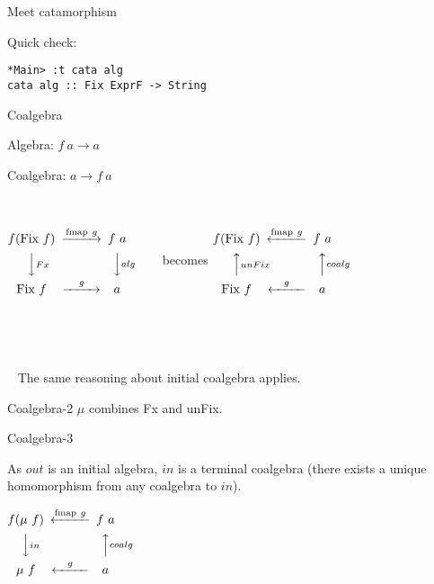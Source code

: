 \documentclass{beamer}
\newcommand{\hin}[2]{}
\begin{document}
\begin{frame}[fragile]{Meet catamorphism}

\hin{110}{110}


\hin{115}{116}

Quick check:

\hin{43}{46}

\begin{verbatim}
*Main> :t cata alg
cata alg :: Fix ExprF -> String
\end{verbatim}
\end{frame}


\begin{frame}[fragile]{Coalgebra}

Algebra: $f\ a \rightarrow a$

Coalgebra: $a \rightarrow f\ a$

~

$
\begin{CD}
f (\text{Fix} \ f) @>\text{fmap} \ g>> f\ a\\
@VVFxV @VValgV\\
\text{Fix} \ f @>g>> a
\end{CD}
$
~~~~~becomes 
$
\begin{CD}
f (\text{Fix} \ f) @<\text{fmap} \ g<< f\ a\\
@AAunFixA @AAcoalgA\\
\text{Fix} \ f @<g<< a
\end{CD}
$

~

~

~
The same reasoning about initial coalgebra applies.


\end{frame}


\begin{frame}{Coalgebra-2}
$\mu$ combines Fx and unFix. 

\hin{141}{141}

\hin{142}{142}
\hin{55}{55}
\hin{145}{149}
\end{frame}

\begin{frame}{Coalgebra-3}

As $out$ is an initial algebra, $in$ is a terminal coalgebra (there exists a unique homomorphism from any coalgebra to $in$).
\begin{center}

$
\begin{CD}
f (\mu \ f) @<\text{fmap} \ g<< f\ a\\
@VVinV @AAcoalgA\\
\mu \ f @<g<< a
\end{CD}
$

\end{center}
\end{frame}
\end{document}
